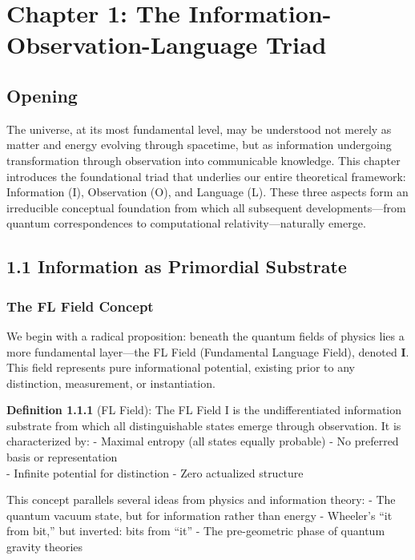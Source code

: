 \section{Chapter 1: The Information-Observation-Language
Triad}\label{chapter-1-the-information-observation-language-triad}

\subsection{Opening}\label{opening}

The universe, at its most fundamental level, may be understood not
merely as matter and energy evolving through spacetime, but as
information undergoing transformation through observation into
communicable knowledge. This chapter introduces the foundational triad
that underlies our entire theoretical framework: Information (I),
Observation (O), and Language (L). These three aspects form an
irreducible conceptual foundation from which all subsequent
developments---from quantum correspondences to computational
relativity---naturally emerge.

\subsection{1.1 Information as Primordial
Substrate}\label{information-as-primordial-substrate}

\subsubsection{The FL Field Concept}\label{the-fl-field-concept}

We begin with a radical proposition: beneath the quantum fields of
physics lies a more fundamental layer---the FL Field (Fundamental
Language Field), denoted \textbf{I}. This field represents pure
informational potential, existing prior to any distinction, measurement,
or instantiation.

\textbf{Definition 1.1.1} (FL Field): The FL Field I is the
undifferentiated information substrate from which all distinguishable
states emerge through observation. It is characterized by: - Maximal
entropy (all states equally probable) - No preferred basis or
representation\\
- Infinite potential for distinction - Zero actualized structure

This concept parallels several ideas from physics and information
theory: - The quantum vacuum state, but for information rather than
energy - Wheeler's ``it from bit,'' but inverted: bits from ``it'' - The
pre-geometric phase of quantum gravity theories

